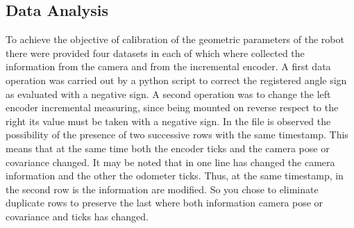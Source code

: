 \subsection{Data Analysis}
To achieve the objective of calibration of the geometric parameters of the robot there were provided four datasets in each of which where collected the information from the camera and from the incremental encoder.
A first data operation was carried out by a python script to correct the registered angle sign as evaluated with a negative sign.
A second operation was to change the left encoder incremental measuring, since being mounted on reverse respect to the right its value must be taken with a negative sign.
In the file is observed the possibility of the presence of two successive rows with the same timestamp. 
This means that at the same time both the encoder ticks and the camera pose or covariance changed.
It may be noted that in one line has changed the camera information and the other the odometer ticks. 
Thus, at the same timestamp, in the second row is the information are modified.
So you chose to eliminate duplicate rows to preserve the last where both information camera pose or covariance and ticks has changed.